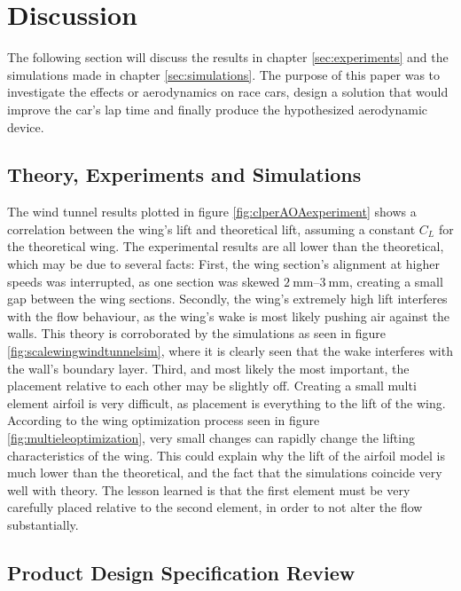 \chapter{Discussion}
  The following section will discuss the results in chapter \ref{sec:experiments} and the simulations made in chapter \ref{sec:simulations}. The purpose of this paper was to investigate the effects or aerodynamics on race cars, design a solution that would improve the car's lap time and finally produce the hypothesized aerodynamic device.

  \section{Theory, Experiments and Simulations}

  The wind tunnel results plotted in figure \ref{fig:clperAOAexperiment} shows a correlation between the wing's lift and theoretical lift, assuming a constant $C_L$ for the theoretical wing. The experimental results are all lower than the theoretical, which may be due to several facts: First, the wing section's alignment at higher speeds was interrupted, as one section was skewed $\SIrange{2}{3}{\milli\metre}$, creating a small gap between the wing sections. Secondly, the wing's extremely high lift interferes with the flow behaviour, as the wing's wake is most likely pushing air against the walls. This theory is corroborated by the simulations as seen in figure \ref{fig:scalewingwindtunnelsim}, where it is clearly seen that the wake interferes with the wall's boundary layer. Third, and most likely the most important, the placement relative to each other may be slightly off. Creating a small multi element airfoil is very difficult, as placement is everything to the lift of the wing. According to the wing optimization process seen in figure \ref{fig:multieleoptimization}, very small changes can rapidly change the  lifting characteristics of the wing. This could explain why the lift of the airfoil model is much lower than the theoretical, and the fact that the simulations coincide very well with theory. The lesson learned is that the first element must be very carefully placed relative to the second element, in order to not alter the flow substantially.




\section{Product Design Specification Review}


